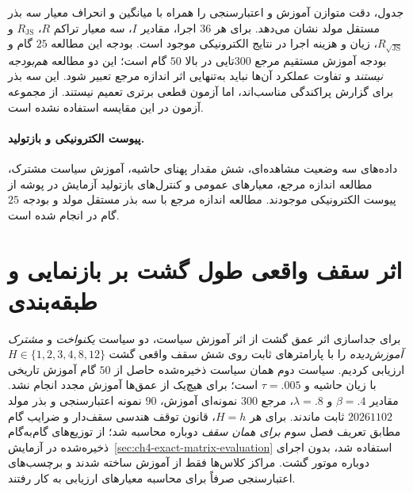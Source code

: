

جدول، دقت متوازن آموزش و اعتبارسنجی را همراه با میانگین و انحراف معیار سه بذر مستقل مولد نشان می‌دهد. برای هر $36$ اجرا، مقادیر $I$، سه معیار تراکم $R$، $R_{\mathrm{JS}}$ و $R_{\sqrt{\mathrm{JS}}}$، زیان و هزینه اجرا در نتایج الکترونیکی موجود است. بودجه این مطالعه $25$ گام و بودجه آموزش مستقیم مرجع $300$تایی در بالا $50$ گام است؛ این دو مطالعه \emph{هم‌بودجه نیستند} و تفاوت عملکرد آن‌ها نباید به‌تنهایی اثر اندازه مرجع تعبیر شود. این سه بذر برای گزارش پراکندگی مناسب‌اند، اما آزمون قطعی برتری تعمیم نیستند. از مجموعه آزمون در این مقایسه استفاده نشده است.

\paragraph{پیوست الکترونیکی و بازتولید.}
داده‌های سه وضعیت مشاهده‌ای، شش مقدار پهنای حاشیه، آموزش سیاست مشترک، مطالعه اندازه مرجع، معیارهای عمومی و کنترل‌های بازتولید آزمایش  در پوشه  از پیوست الکترونیکی موجودند. مطالعه اندازه مرجع با سه بذر مستقل مولد و بودجه $25$ گام در  انجام شده است.

\section{اثر سقف واقعی طول گشت بر بازنمایی و طبقه‌بندی}
\label{sec:ch4-true-horizon-effect}
برای جداسازی اثر عمق گشت از اثر آموزش سیاست، دو سیاست
\emph{یکنواخت} و \emph{مشترک آموزش‌دیده} را با پارامترهای
ثابت روی شش سقف واقعی گشت
$H\in\{1,2,3,4,8,12\}$ ارزیابی کردیم.
سیاست دوم همان سیاست ذخیره‌شده حاصل از $50$
گام آموزش تاریخی با زیان حاشیه 
و $\tau=.005$ است؛ برای هیچ‌یک از عمق‌ها
آموزش مجدد انجام نشد. مقادیر
$\beta=.4$ و $\lambda=.8$، مرجع $300$ نمونه‌ای
آموزش، $90$ نمونه اعتبارسنجی و بذر مولد
$20261102$ ثابت ماندند. برای هر $H=h$،
قانون توقف هندسی سقف‌دار و ضرایب گام مطابق
تعریف فصل سوم \emph{برای همان سقف} دوباره
محاسبه شد؛ از توزیع‌های گام‌به‌گام ذخیره‌شده
در آزمایش~\ref{sec:ch4-exact-matrix-evaluation}
استفاده شد، بدون اجرای دوباره موتور گشت.
مراکز کلاس‌ها فقط از آموزش ساخته شدند
و برچسب‌های اعتبارسنجی صرفاً برای محاسبه
معیارهای ارزیابی به کار رفتند.



